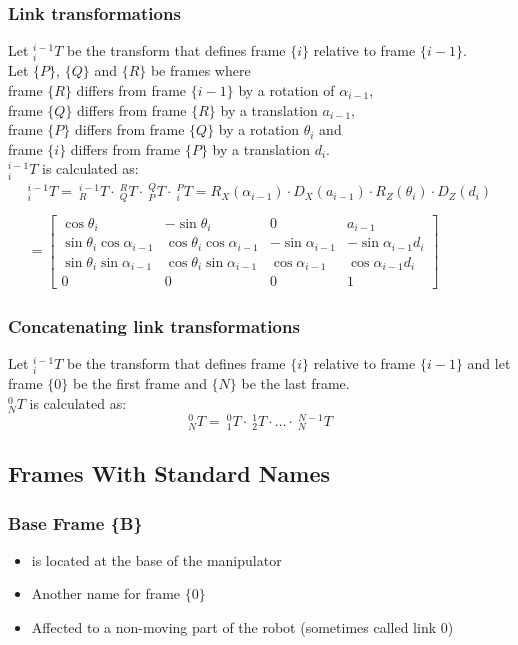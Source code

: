 \documentclass[10pt,a4paper]{article}
\newcommand{\tab}[1][1]{\hspace*{#1cm}}
\begin{document}
\subsubsection{Link transformations}
Let $^{i-1}_iT$ be the transform that defines frame $\{i\}$ relative to frame $\{i-1\}$. \\
Let $\{P\}$, $\{Q\}$ and $\{R\}$ be frames where \\
\tab frame $\{R\}$ differs from frame $\{i-1\}$ by a rotation of $\alpha_{i-1}$, \\
\tab frame $\{Q\}$ differs from frame $\{R\}$ by a translation $a_{i-1}$, \\
\tab frame $\{P\}$ differs from frame $\{Q\}$ by a rotation $\theta_i$ and \\
\tab frame $\{i\}$ differs from frame $\{P\}$ by a translation $d_i$. \\
$^{i-1}_iT$ is calculated as: \\
$$
\begin{multlined}
	^{i-1}_iT = ~^{i-1}_RT ⋅ ~^R_QT ⋅ ~^Q_PT ⋅ ~^P_iT = R_X(\alpha_{i-1}) ⋅ D_X(a_{i-1}) ⋅ R_Z(\theta_i) ⋅ D_Z(d_i) \\ \\
	= \begin{bmatrix}
		\cos \theta_i & -\sin \theta_i & 0 & a_{i-1} \\
		\sin \theta_i \cos \alpha_{i-1} & \cos \theta_i \cos \alpha_{i-1} & -\sin \alpha_{i-1} & -\sin \alpha_{i-1} d_i \\
		\sin \theta_i \sin \alpha_{i-1} & \cos \theta_i \sin \alpha_{i-1} & \cos \alpha_{i-1} & \cos \alpha_{i-1} d_i \\
		0 & 0 & 0 & 1		
	\end{bmatrix}
\end{multlined}
$$

\subsubsection{Concatenating link transformations}
Let $^{i-1}_iT$ be the transform that defines frame $\{i\}$ relative to frame $\{i-1\}$ and let frame $\{0\}$ be the first frame and $\{N\}$ be the last frame. \\
$^0_NT$ is calculated as:
$$
	^0_NT = ~^0_1T ⋅ ~^1_2T ⋅ \dots ⋅ ~^{N-1}_NT
$$

\subsection{Frames With Standard Names}
\subsubsection{Base Frame \{B\}}
\begin{itemize}
	\item is located at the base of the manipulator
	\item Another name for frame $\{0\}$
	\item Affected to a non-moving part of the robot (sometimes called link 0)
\end{itemize}
\end{document}
